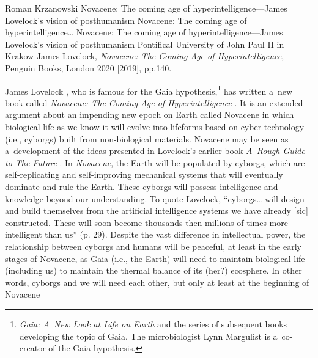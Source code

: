 \begin{newrevengenv}{Roman Krzanowski}
	{Novacene: The coming age of hyperintelligence---James Lovelock's vision of posthumanism}
	{Novacene: The coming age of hyperintelligence\ldots}
	{Novacene: The coming age of hyperintelligence---James Lovelock's vision of posthumanism}
	{Pontifical University of John Paul II in Krakow}
	{James Lovelock, \textit{Novacene: The Coming Age of Hyperintelligence}, Penguin Books, London 2020 [2019], pp.140.}
	


\lettrine[loversize=0.13,lines=2,lraise=-0.03,nindent=0em,findent=0.2pt]%
{J}{}ames Lovelock
\parencite*[][]{lovelock_james_2021}, %
 who is famous for the Gaia hypothesis,\footnote{\textit{Gaia: A~New Look at Life on Earth} 
\parencites*[][]{lovelock_gaia:_1979}[][3rd~ed.]{lovelock_gaia_2000} %
 and the series of subsequent books developing the topic of Gaia. The microbiologist Lynn Margulist is a~co-creator of the Gaia hypothesis.} has written a~new book called \textit{Novacene: The Coming Age of Hyperintelligence} 
\parencite*[][]{lovelock_novacene_2019}. %
 It is an extended argument about an impending new epoch on Earth called Novacene in which biological life as we know it will evolve into lifeforms based on cyber technology (i.e., cyborgs) built from non-biological materials. Novacene may be seen as a~development of the ideas presented in Lovelock's earlier book \textit{A~Rough Guide to The Future} 
\parencite*[][]{lovelock_rough_2014}. %
 In \textit{Novacene}, the Earth will be populated by cyborgs, which are self-replicating and self-improving mechanical systems that will eventually dominate and rule the Earth. These cyborgs will possess intelligence and knowledge beyond our understanding. To quote Lovelock, ``cyborgs… will design and build themselves from the artificial intelligence systems we have already [sic] constructed. These will soon become thousands then millions of times more intelligent than us'' (p. 29). Despite the vast difference in intellectual power, the relationship between cyborgs and humans will be peaceful, at least in the early stages of Novacene, as Gaia (i.e., the Earth) will need to maintain biological life (including us) to maintain the thermal balance of its (her?) ecosphere. In other words, cyborgs and we will need each other, but only at least at the beginning of Novacene 

\end{newrevengenv}

